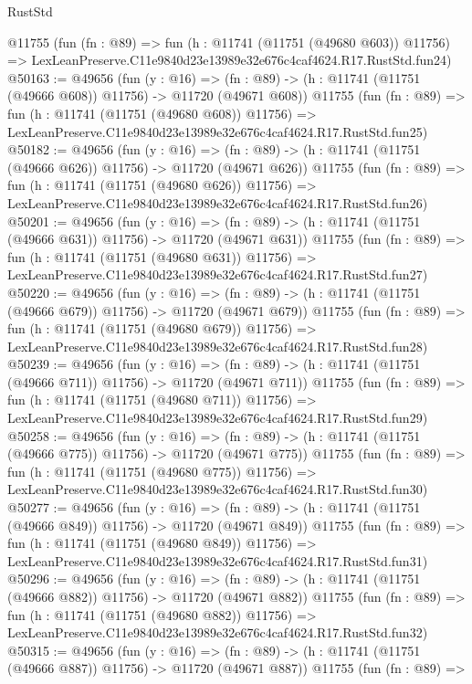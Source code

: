 \begin{lexlean}{RustStd}
\begin{coremodule}
    @11755
    (fun (fn : @89) =>
    fun (h : @11741 (@11751 (@49680 @603)) @11756) =>
    LexLeanPreserve.C11e9840d23e13989e32e676c4caf4624.R17.RustStd.fun24)
@50163 := @49656
    (fun (y : @16) =>
    (fn : @89) -> (h : @11741 (@11751 (@49666 @608)) @11756) -> @11720 (@49671 @608))
    @11755
    (fun (fn : @89) =>
    fun (h : @11741 (@11751 (@49680 @608)) @11756) =>
    LexLeanPreserve.C11e9840d23e13989e32e676c4caf4624.R17.RustStd.fun25)
@50182 := @49656
    (fun (y : @16) =>
    (fn : @89) -> (h : @11741 (@11751 (@49666 @626)) @11756) -> @11720 (@49671 @626))
    @11755
    (fun (fn : @89) =>
    fun (h : @11741 (@11751 (@49680 @626)) @11756) =>
    LexLeanPreserve.C11e9840d23e13989e32e676c4caf4624.R17.RustStd.fun26)
@50201 := @49656
    (fun (y : @16) =>
    (fn : @89) -> (h : @11741 (@11751 (@49666 @631)) @11756) -> @11720 (@49671 @631))
    @11755
    (fun (fn : @89) =>
    fun (h : @11741 (@11751 (@49680 @631)) @11756) =>
    LexLeanPreserve.C11e9840d23e13989e32e676c4caf4624.R17.RustStd.fun27)
@50220 := @49656
    (fun (y : @16) =>
    (fn : @89) -> (h : @11741 (@11751 (@49666 @679)) @11756) -> @11720 (@49671 @679))
    @11755
    (fun (fn : @89) =>
    fun (h : @11741 (@11751 (@49680 @679)) @11756) =>
    LexLeanPreserve.C11e9840d23e13989e32e676c4caf4624.R17.RustStd.fun28)
@50239 := @49656
    (fun (y : @16) =>
    (fn : @89) -> (h : @11741 (@11751 (@49666 @711)) @11756) -> @11720 (@49671 @711))
    @11755
    (fun (fn : @89) =>
    fun (h : @11741 (@11751 (@49680 @711)) @11756) =>
    LexLeanPreserve.C11e9840d23e13989e32e676c4caf4624.R17.RustStd.fun29)
@50258 := @49656
    (fun (y : @16) =>
    (fn : @89) -> (h : @11741 (@11751 (@49666 @775)) @11756) -> @11720 (@49671 @775))
    @11755
    (fun (fn : @89) =>
    fun (h : @11741 (@11751 (@49680 @775)) @11756) =>
    LexLeanPreserve.C11e9840d23e13989e32e676c4caf4624.R17.RustStd.fun30)
@50277 := @49656
    (fun (y : @16) =>
    (fn : @89) -> (h : @11741 (@11751 (@49666 @849)) @11756) -> @11720 (@49671 @849))
    @11755
    (fun (fn : @89) =>
    fun (h : @11741 (@11751 (@49680 @849)) @11756) =>
    LexLeanPreserve.C11e9840d23e13989e32e676c4caf4624.R17.RustStd.fun31)
@50296 := @49656
    (fun (y : @16) =>
    (fn : @89) -> (h : @11741 (@11751 (@49666 @882)) @11756) -> @11720 (@49671 @882))
    @11755
    (fun (fn : @89) =>
    fun (h : @11741 (@11751 (@49680 @882)) @11756) =>
    LexLeanPreserve.C11e9840d23e13989e32e676c4caf4624.R17.RustStd.fun32)
@50315 := @49656
    (fun (y : @16) =>
    (fn : @89) -> (h : @11741 (@11751 (@49666 @887)) @11756) -> @11720 (@49671 @887))
    @11755
    (fun (fn : @89) =>

\end{coremodule}
\end{lexlean}
